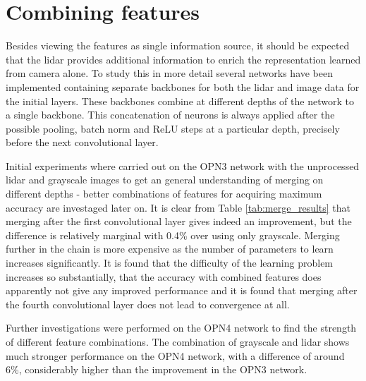 \section{Combining features}
Besides viewing the features as single information source, it should be expected that the lidar provides additional information to enrich the representation learned from camera alone. To study this in more detail several networks have been implemented containing separate backbones for both the lidar and image data for the initial layers. These backbones combine at different depths of the network to a single backbone. This concatenation of neurons is always applied after the possible pooling, batch norm and ReLU steps at a particular depth, precisely before the next convolutional layer.

Initial experiments where carried out on the OPN3 network with the unprocessed lidar and grayscale images to get an general understanding of merging on different depths - better combinations of features for acquiring maximum accuracy are investaged later on. It is clear from Table \ref{tab:merge_results} that merging after the first convolutional layer gives indeed an improvement, but the difference is relatively marginal with 0.4\% over using only grayscale. Merging further in the chain is more expensive as the number of parameters to learn increases significantly. It is found that the difficulty of the learning problem increases so substantially, that the accuracy with combined features does apparently not give any improved performance and it is found that merging after the fourth convolutional layer does not lead to convergence at all. 

Further investigations were performed on the OPN4 network to find the strength of different feature combinations. The combination of grayscale and lidar shows much stronger performance on the OPN4 network, with a difference of around 6\%, considerably higher than the improvement in the OPN3 network.

